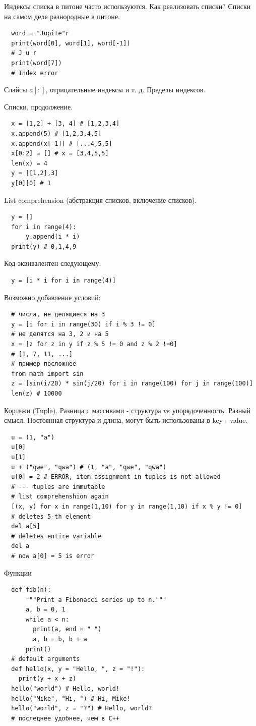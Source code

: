 \documentclass{book}
\begin{document}
Индексы списка в питоне часто используются. Как реализовать списки? Списки на самом деле
разнородные в питоне.
\begin{verbatim}
  word = "Jupite"r
  print(word[0], word[1], word[-1])
  # J u r
  print(word[7])
  # Index error
\end{verbatim}

Слайсы $a[:]$, отрицательные индексы и т. д. Пределы индексов.

Списки, продолжение.
\begin{verbatim}
  x = [1,2] + [3, 4] # [1,2,3,4]
  x.append(5) # [1,2,3,4,5]
  x.append(x[-1]) # [...4,5,5]
  x[0:2] = [] # x = [3,4,5,5]
  len(x) = 4
  y = [[1,2],3]
  y[0][0] # 1
\end{verbatim}

List comprehension (абстракция списков, включение списков).
\begin{verbatim}
  y = []
  for i in range(4):
      y.append(i * i)
  print(y) # 0,1,4,9
\end{verbatim}
Код эквивалентен следующему:
\begin{verbatim}
  y = [i * i for i in range(4)]
\end{verbatim}
Возможно добавление условий:
\begin{verbatim}
  # числа, не делящиеся на 3
  y = [i for i in range(30) if i % 3 != 0]
  # не делятся на 3, 2 и на 5
  x = [z for z in y if z % 5 != 0 and z % 2 !=0]
  # [1, 7, 11, ...]
  # пример посложнее
  from math import sin
  z = [sin(i/20) * sin(j/20) for i in range(100) for j in range(100)]
  len(z) # 10000
\end{verbatim}

Кортежи (Tuple). Разница с массивами - структура vs упорядоченность. Разный смысл. Постоянная
структура и длина, могут быть использованы в key - value.
\begin{verbatim}
  u = (1, "a")
  u[0]
  u[1]
  u + ("qwe", "qwa") # (1, "a", "qwe", "qwa")
  u[0] = 2 # ERROR, item assignment in tuples is not allowed
  # --- tuples are immutable
  # list comprehenshion again
  [(x, y) for x in range(1,10) for y in range(1,10) if x % y != 0]
  # deletes 5-th element
  del a[5]
  # deletes entire variable
  del a
  # now a[0] = 5 is error
\end{verbatim}

Функции
\begin{verbatim}
  def fib(n):
      """Print a Fibonacci series up to n."""
      a, b = 0, 1
      while a < n:
        print(a, end = " ")
        a, b = b, b + a
      print()
  # default arguments
  def hello(x, y = "Hello, ", z = "!"):
    print(y + x + z)
  hello("world") # Hello, world!
  hello("Mike", "Hi, ") # Hi, Mike!
  hello("world", z = "?") # Hello, world?
  # последнее удобнее, чем в C++
\end{verbatim}
\end{document}
